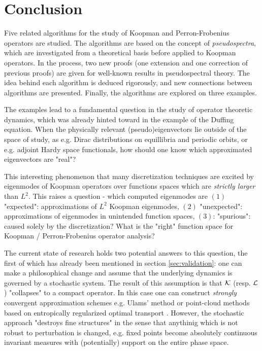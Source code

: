 
\section{Conclusion}

Five related algorithms for the study of Koopman and Perron-Frobenius operators are studied. 
The algorithms are based on the concept of \emph{pseudospectra}, which are investigated 
from a theoretical basis before applied to Koopman operators. In the process, two new 
proofs (one extension and one correction of previous proofs) are given for well-known 
results in pseudospectral theory. The idea behind each algorithm is deduced rigorously, 
and new connections between algorithms are presented. Finally, the algorithms are explored 
on three examples. 

The examples lead to a fundamental question in the study of operator theoretic dynamics, 
which was already hinted toward in the example of the Duffing equation. When the 
physically relevant (pseudo)eigenvectors lie outside of the space of study, as e.g. Dirac 
distributions on equillibria and periodic orbits, or e.g. adjoint Hardy space functionals, 
how should one know which approximated eigenvectors are "real"? 

This interesting phenomenon that many discretization techniques are excited by eigenmodes 
of Koopman operators over functions spaces which are \emph{strictly larger} than $L^2$. 
This raises a question - which computed eigenmodes are $(1)$ "expected": 
approximations of $L^2$ Koopman eigenmodes, $(2)$ "unexpected": approximations of 
eigenmodes in unintended function spaces, $(3)$: "spurious": caused solely by the 
discretization? What is the "right" function space for Koopman / Perron-Frobenius 
operator analysis? 

The current state of research holds two potential answers to this question, the first of 
which has already been mentioned in section \ref{sec:validation}: one can make a 
philosophical change and assume that the underlying dynamics is governed by a 
stochastic system. The result of this assumption is that $\mathcal{K}$ (resp. $\mathcal{L}$) 
"collapses" to a compact operator. In this case one can construct \emph{strongly} 
convergent approximation schemes e.g. Ulams' method \cite{attr} or point-cloud methods 
based on entropically regularized optimal transport \cite{entropic}. However, the 
stochastic approach "destroys fine structures" in the sense that anythinig which is 
not robust to perturbation is changed, e.g. fixed points become absolutely continuous 
invariant measures with (potentially) support on the entire phase space. 

